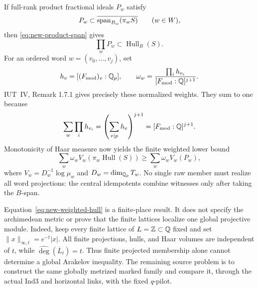 If full-rank product fractional ideals $P_w$ satisfy
\[
 P_w\subset\overline{\operatorname{span}_{B_w}(\pi_wS)}
 \qquad(w\in W),
\]
then \eqref{eq:new-product-span} gives
\[
       \prod_wP_w\subset\operatorname{Hull}_B(S).
\]
For an ordered word $w=(v_0,\ldots,v_j)$, set
\[
 h_v=[(F_{\rm mod})_v:\mathbb Q_p],\qquad
 \omega_w=\frac{\prod_i h_{v_i}}
                 {[F_{\rm mod}:\mathbb Q]^{j+1}}.
\]
IUT~IV, Remark 1.7.1 gives precisely these normalized weights.  They sum to
one because
\[
 \sum_w\prod_i h_{v_i}
 =\left(\sum_{v\mid p}h_v\right)^{j+1}
 =[F_{\rm mod}:\mathbb Q]^{j+1}.
\]
Monotonicity of Haar measure now yields the finite weighted lower bound
\begin{equation}\label{eq:new-weighted-hull}
 \sum_w\omega_w V_w(\pi_w\operatorname{Hull}(S))
 \geq\sum_w\omega_w V_w(P_w),
\end{equation}
where $V_w=D_w^{-1}\log\mu_w$ and
$D_w=\dim_{\mathbb Q_p}T_w$.  No single raw member must realize all word
projections: the central idempotents combine witnesses only after taking the
$B$-span.

Equation~\eqref{eq:new-weighted-hull} is a finite-place result.  It does not
specify the archimedean metric or prove that the finite lattices localize one
global projective module.  Indeed, keep every finite lattice of
$L=\mathbb Z\subset\mathbb Q$ fixed and set
$\lVert x\rVert_{\infty,t}=e^{-t}|x|$.  All finite projections, hulls, and
Haar volumes are independent of $t$, while
$\widehat\deg(\overline L_t)=t$.  Thus finite projected membership alone
cannot determine a global Arakelov inequality.  The remaining source problem
is to construct the same globally metrized marked family and compare it,
through the actual Ind3 and horizontal links, with the fixed $q$-pilot.
